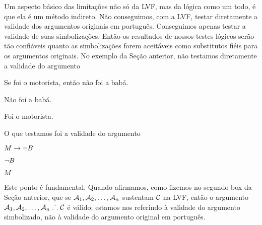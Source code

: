Um aspecto básico das limitações não só da LVF, mas da lógica como um todo, é que ela é um método indireto.
Não conseguimos, com a LVF, testar diretamente a validade dos argumentos originais em português.
Conseguimos apenas testar a validade de suas simbolizações.
Então os resultados de nossos testes lógicos serão tão confiáveis quanto as simbolizações forem aceitáveis como substitutos fiéis para os argumentos originais.
No exemplo da Seção anterior, não testamos diretamente a validade do argumento
	\begin{earg}
		\item[] Se foi o motorista, então não foi a babá.
		\item[] Não foi a babá.
		\item[\therefore] Foi o motorista.
	\end{earg}
O que testamos foi a validade do argumento
	\begin{earg}
		\item[] $M \rightarrow \neg B$
		\item[] $\neg B$
		\item[\therefore] $M$
	\end{earg}

Este ponto é fundamental.
Quando afirmamos, como fizemos no segundo box da Seção anterior, que se $\mathcal{A}_1, \mathcal{A}_2, \ldots, \mathcal{A}_n$ sustentam $\mathcal{C}$ na LVF, então o argumento  $\mathcal{A}_1, \mathcal{A}_2, \ldots, \mathcal{A}_n \mathrel{\ldotp\dot{}\,\ldotp} \mathcal{C}$ é  válido; estamos nos referindo à validade do argumento simbolizado, não à validade do argumento original em português.

